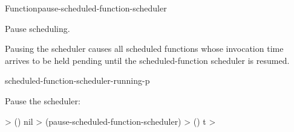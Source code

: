 \documentclass[10pt,twoside,english,pdftex]{article}
\begin{document}
\begin{functiondoc}{Function}{pause-scheduled-function-scheduler}%
  {\noargs{}}
%

\fnsyntax

\fnpurpose Pause  scheduling.

\fnpackage {}

\fnmodule {}

\fnerrors
\nothreads{}

\fndescription Pausing the  scheduler causes all
scheduled functions whose invocation time arrives to be held pending until the
scheduled-function scheduler is resumed.

\begin{alsos}{scheduled-function-scheduler-running-p}
\end{alsos}

%
\fnexample
Pause the  scheduler:
%
\W\supp
\begin{example}
  > ()
  nil
  > (pause-scheduled-function-scheduler)
  > ()
  t
  >
\end{example}

\end{functiondoc}

\end{document}
